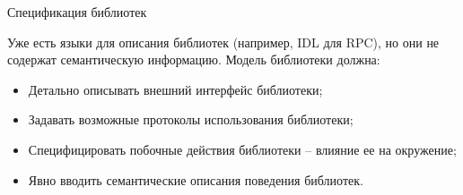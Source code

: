 \documentclass[12pt]{beamer}
\begin{document}
{
\begin{frame}{Спецификация библиотек}
\begin{mybox}[]
	Уже есть языки для описания библиотек (например, IDL для RPC), но они не содержат семантическую информацию.
	Модель библиотеки должна:
\begin{itemize}
	\item Детально описывать внешний интерфейс библиотеки;
	\item Задавать возможные протоколы использования библиотеки;
	\item Специфицировать побочные действия библиотеки – влияние ее на окружение;
	\item Явно вводить семантические описания поведения библиотек.
\end{itemize}
\end{mybox}
\end{frame}
}
\end{document}

